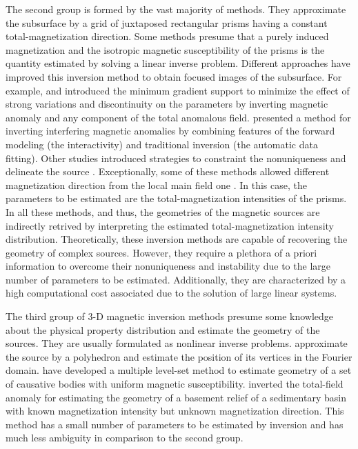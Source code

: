 The second group is formed by the vast majority of methods. 
They approximate the subsurface by a grid of juxtaposed rectangular prisms having 
a constant total-magnetization direction. Some methods presume that a purely induced 
magnetization \cite[e.g., ][]{cribb-1976,li_3-d_1996,pilkington_3-d_1997} and the 
isotropic magnetic susceptibility of the prisms is the quantity estimated by solving 
a linear inverse problem. Different approaches have improved this inversion method to obtain focused images of the subsurface. For example, \cite{portniaguine_focusing_1999} and \cite{portniaguine_3d_2002} introduced the minimum gradient support to minimize the effect of strong variations and discontinuity on the parameters by inverting magnetic anomaly and any component of the total anomalous field. \cite{barbosa_interactive_2006} presented a method for inverting interfering magnetic anomalies by combining  features of the forward modeling (the interactivity) and traditional inversion (the automatic data fitting). Other studies introduced strategies to constraint the nonuniqueness and delineate the source \cite[]{tontini,pilkington_3d_2009,shamsipour_3d_2011,cella_inversion_2012,abedi-2015}. Exceptionally, some of these methods allowed different magnetization direction from the local main field one \cite[e.g., ][]{pignatelli-2006}. 
In this case, the parameters to be estimated are the total-magnetization intensities 
of the prisms. 
In all these methods, and thus, the geometries of the magnetic sources are indirectly retrived by interpreting the estimated total-magnetization intensity 
distribution. 
Theoretically, these inversion methods are capable of recovering the geometry of complex 
sources. However, they require a plethora of a priori information to overcome 
their nonuniqueness and instability due to the large number of parameters 
to be estimated. Additionally, they are characterized by a high 
computational cost associated due to the solution of large linear systems.

The third group of 3-D magnetic inversion methods presume some knowledge about the 
physical property distribution and estimate the geometry of the sources. 
They are usually formulated as nonlinear inverse problems. 
\cite{wang_inversion_1990} approximate the source by a polyhedron and estimate 
the position of its vertices in the Fourier domain. 
\cite{wenbin-2017} have developed a multiple level-set method to estimate geometry 
of a set of causative bodies with uniform magnetic susceptibility. \cite{hidalgo-2019} inverted the total-field anomaly for estimating the geometry of a basement relief of a sedimentary basin with known magnetization intensity but unknown magnetization direction. 
This method has a small number of parameters to be estimated by inversion and 
has much less ambiguity in comparison to the second group. 

